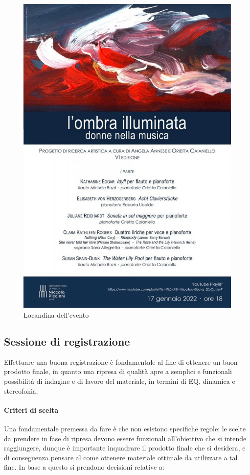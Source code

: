 	\begin{figure}[h]
		\begin{center}
			\includegraphics[width = .50\textwidth, height = .43\textheight]{img/image1.jpeg}
			\caption {Locandina dell'evento}
		\end{center}
	\end{figure}
	
	\subsection{Sessione di registrazione}
	Effettuare una buona registrazione è fondamentale al fine di ottenere un buon prodotto finale, in quanto una ripresa di qualità apre a semplici e funzionali possibilità di indagine e di lavoro del materiale, in termini di EQ, dinamica e stereofonia.
	
	\paragraph{Criteri di scelta}
	Una fondamentale premessa da fare è che non esistono specifiche regole: le scelte da prendere in fase di ripresa devono essere funzionali all'obiettivo che si intende raggiungere, dunque è importante inquadrare il prodotto finale che si desidera, e di conseguenza pensare al come ottenere materiale ottimale da utilizzare a tal fine. In base a questo si prendono decisioni relative a:
	
